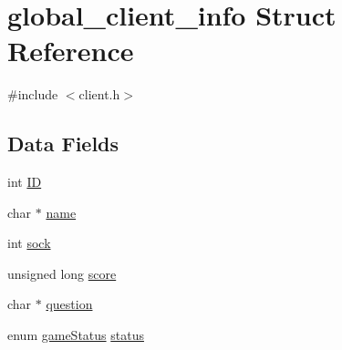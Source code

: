 \hypertarget{structglobal__client__info}{
\section{global\_\-client\_\-info Struct Reference}
\label{structglobal__client__info}
}


{\ttfamily \#include $<$client.h$>$}

\subsection*{Data Fields}
\begin{DoxyCompactItemize}
\item 
int \hyperlink{structglobal__client__info_af180e926633cde08a05ccbc3af397ee4}{ID}
\item 
char $\ast$ \hyperlink{structglobal__client__info_a5ac083a645d964373f022d03df4849c8}{name}
\item 
int \hyperlink{structglobal__client__info_a5903d0b282fc5eae503de618f896b5e1}{sock}
\item 
unsigned long \hyperlink{structglobal__client__info_a5f344aacb1777ce40b4b692a54cb09e6}{score}
\item 
char $\ast$ \hyperlink{structglobal__client__info_aa25249a98b79cff6e478cfb4bab90446}{question}
\item 
enum \hyperlink{client_2src_2client_8h_a12ca651cd1b9eb7aeeb0d0c8a2cdd5e0}{gameStatus} \hyperlink{structglobal__client__info_a364d090f640056ac79ce3ca1416407ef}{status}
\end{DoxyCompactItemize}


